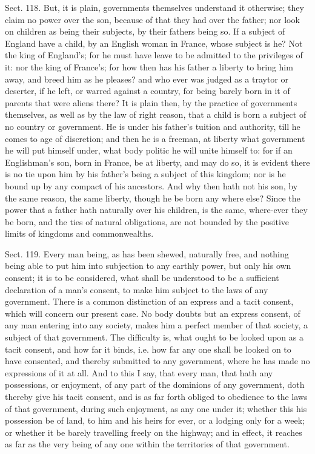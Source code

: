 \documentclass[11pt,openany]{book}
\begin{document}
Sect. 118. But, it is plain, governments themselves understand it otherwise; they claim no power over the son, because of that they had over the father; nor look on children as being their subjects, by their fathers being so. If a subject of England have a child, by an English woman in France, whose subject is he? Not the king of England's; for he must have leave to be admitted to the privileges of it: nor the king of France's; for how then has his father a liberty to bring him away, and breed him as he pleases? and who ever was judged as a traytor or deserter, if he left, or warred against a country, for being barely born in it of parents that were aliens there? It is plain then, by the practice of governments themselves, as well as by the law of right reason, that a child is born a subject of no country or government. He is under his father's tuition and authority, till he comes to age of discretion; and then he is a freeman, at liberty what government he will put himself under, what body politic he will unite himself to: for if an Englishman's son, born in France, be at liberty, and may do so, it is evident there is no tie upon him by his father's being a subject of this kingdom; nor is he bound up by any compact of his ancestors. And why then hath not his son, by the same reason, the same liberty, though he be born any where else? Since the power that a father hath naturally over his children, is the same, where-ever they be born, and the ties of natural obligations, are not bounded by the positive limits of kingdoms and commonwealths.

Sect. 119. Every man being, as has been shewed, naturally free, and nothing being able to put him into subjection to any earthly power, but only his own consent; it is to be considered, what shall be understood to be a sufficient declaration of a man's consent, to make him subject to the laws of any government. There is a common distinction of an express and a tacit consent, which will concern our present case. No body doubts but an express consent, of any man entering into any society, makes him a perfect member of that society, a subject of that government. The difficulty is, what ought to be looked upon as a tacit consent, and how far it binds, i.e. how far any one shall be looked on to have consented, and thereby submitted to any government, where he has made no expressions of it at all. And to this I say, that every man, that hath any possessions, or enjoyment, of any part of the dominions of any government, doth thereby give his tacit consent, and is as far forth obliged to obedience to the laws of that government, during such enjoyment, as any one under it; whether this his possession be of land, to him and his heirs for ever, or a lodging only for a week; or whether it be barely travelling freely on the highway; and in effect, it reaches as far as the very being of any one within the territories of that government.
\end{document}
